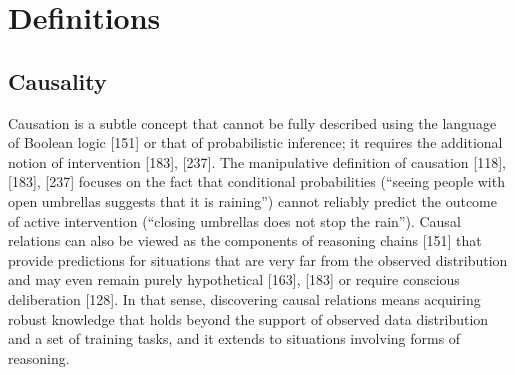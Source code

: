 
\section{Definitions}

\subsection{Causality}

Causation is a subtle concept that cannot be fully
described using the language of Boolean logic [151] or that
of probabilistic inference; it requires the additional
notion of intervention [183], [237]. The manipulative
definition of causation [118], [183], [237] focuses on the
fact that conditional probabilities (“seeing people with
open umbrellas suggests that it is raining”) cannot reliably
predict the outcome of active intervention (“closing
umbrellas does not stop the rain”). Causal relations
can also be viewed as the components of reasoning
chains [151] that provide predictions for situations that
are very far from the observed distribution and may
even remain purely hypothetical [163], [183] or require
conscious deliberation [128]. In that sense, discovering
causal relations means acquiring robust knowledge that
holds beyond the support of observed data distribution
and a set of training tasks, and it extends to situations
involving forms of reasoning. 